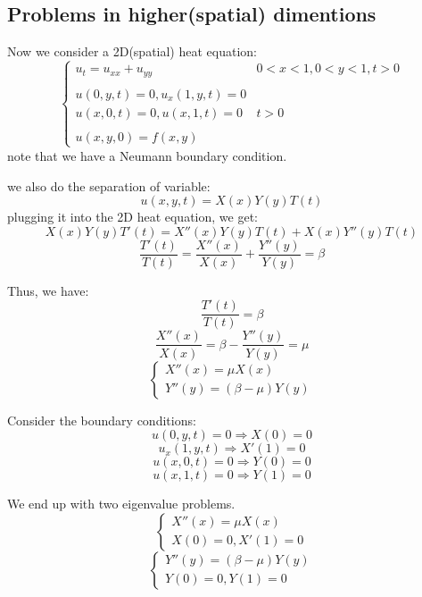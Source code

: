 \documentclass[12pt]{article} %
\begin{document}
\subsection{Problems in higher(spatial) dimentions}
\hspace{5mm}
Now we consider a 2D(spatial) heat equation:
\begin{equation}
\left\{
\begin{array}{lll}
u_{t} = u_{xx} + u_{yy} & 0<x<1, 0<y<1, t>0\\
 \\
 u(0, y, t)=0,  u_{x}(1, y, t)=0 \\
  u(x, 0, t)=0,  u(x, 1, t)=0 & t >0 \\ \\
 u(x, y, 0) = f(x, y)
\end{array}\right.
\end{equation}note that we have a Neumann boundary condition.
\par
we also do the separation of variable:
$$
u(x, y, t) = X(x)Y(y)T(t)
$$plugging it into the 2D heat equation, we get:
$$
X(x)Y(y)T'(t) = X''(x)Y(y)T(t) + X(x)Y''(y)T(t)
$$
$$
\frac{T'(t)}{T(t)}= \frac{X''(x)}{X(x)}+\frac{Y''(y)}{Y(y)} = \beta
$$\par
Thus, we have:
\begin{equation}
\frac{T'(t)}{T(t)}= \beta
\end{equation}
$$
\frac{X''(x)}{X(x)}= \beta - \frac{Y''(y)}{Y(y)} = \mu
$$
\begin{equation}
\left\{
\begin{array}{lll}
X''(x) = \mu X(x)\\
Y''(y) = (\beta - \mu)Y(y)
\end{array}\right.
\end{equation}\par
Consider the boundary conditions:
$$
u(0, y, t)=0 \Rightarrow X(0)=0
$$
$$u_{x}(1, y, t) \Rightarrow X'(1) = 0
$$
$$
u(x, 0, t)=0 \Rightarrow Y(0) = 0
$$
$$
u(x, 1, t)=0 \Rightarrow Y(1) = 0
$$\par
We end up with two eigenvalue problems.
$$
\left\{
\begin{array}{lll}
X''(x) = \mu X(x)\\
X(0)=0, X'(1)=0
\end{array}\right.
$$
$$
\left\{
\begin{array}{lll}
Y''(y) = (\beta - \mu)Y(y)\\
Y(0)=0, Y(1)=0
\end{array}\right.
$$\par
\end{document}
